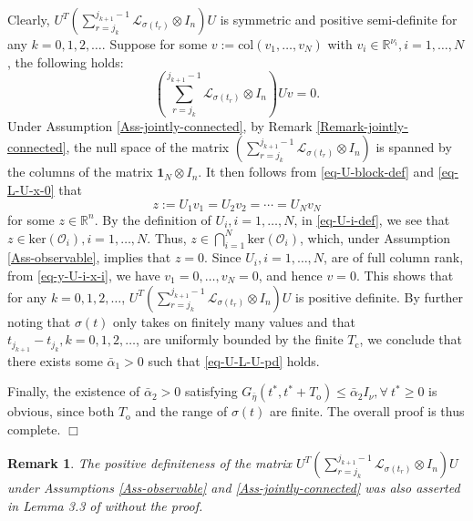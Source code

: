 \documentclass[twocolumn]{autart}
\newcommand{\RR}{\mathbb{R}}
\newtheorem{Remark}{Remark}
\newenvironment{Proof}{\noindent{\em Proof:\/}}{\hfill $\Box$\par}
\begin{document}
\begin{Proof}
Clearly, $U^{T}\left(\sum_{r=j_{k}}^{j_{k+1}-1}\mathcal{L}_{\sigma(t_{r})}\otimes I_{n} \right)U$
  is symmetric and positive semi-definite for any $k=0,1,2,\ldots$.
  Suppose for some
  $v :=\text{col}(v_{1},\ldots, v_{N})$ with $v_{i}\in \RR^{\nu_{i}}, i=1,\ldots,N$,
  the following holds:
  \begin{equation}\label{eq-L-U-x-0}
    \left(\sum_{r=j_{k}}^{j_{k+1}-1}\mathcal{L}_{\sigma(t_{r})}\otimes I_{n} \right)U v=0.
  \end{equation}
 Under Assumption \ref{Ass-jointly-connected}, by Remark \ref{Remark-jointly-connected},
  the null space of the matrix $\left(\sum_{r=j_{k}}^{j_{k+1}-1}\mathcal{L}_{\sigma(t_{r})}\otimes I_{n} \right)$
  is spanned by the columns of the matrix $\mathbf{1}_{N}\otimes I_{n}$.
 It then follows from \eqref{eq-U-block-def} and \eqref{eq-L-U-x-0} that
  \begin{equation}\label{eq-y-U-i-x-i}
    z:=U_{1}v_{1}=U_{2}v_{2}=\cdots=U_{N}v_{N}
  \end{equation}
 for some $z \in \RR^{n}$.
 By the definition of $U_{i}, i=1,\ldots,N$, in \eqref{eq-U-i-def},
 we see that $z \in \text{ker}(\mathcal{O}_{i}), i=1,\ldots,N$.
 Thus, $z\in \bigcap_{i=1}^{N}\text{ker}(\mathcal{O}_{i})$, which,
 under Assumption \ref{Ass-observable}, implies that $z=0$.
 Since $U_{i}, i=1,\ldots,N$, are of full column rank,
 from \eqref{eq-y-U-i-x-i}, we have $v_{1}=0, \ldots, v_{N}=0$, and hence $v=0$.
 This shows that for any $k=0,1,2,\ldots$,
 $U^{T}\left(\sum_{r=j_{k}}^{j_{k+1}-1}\mathcal{L}_{\sigma(t_{r})}\otimes I_{n} \right)U$ is positive definite.
 By further noting that $\sigma(t)$ only takes on finitely many values
 and that $t_{j_{k+1}}-t_{j_{k}}, k=0,1,2,\ldots$, are uniformly bounded by the finite $T_{\text{c}}$,
 we conclude that there exists some $\bar{\alpha}_{1}>0$ such that \eqref{eq-U-L-U-pd} holds.


Finally, the existence of $\bar{\alpha}_{2}>0$ satisfying
$G_{\bar{\eta}}(t^{*},t^{*}+T_{\text{o}}) \le \bar{\alpha}_{2}I_{\nu}, \forall\ t^{*}\ge 0$
is obvious, since both $T_{\text{o}}$ and the range of $\sigma(t)$ are finite.
The overall proof is thus complete.
\end{Proof}


\begin{Remark}
The  positive definiteness of the matrix $U^{T}\left(\sum_{r=j_{k}}^{j_{k+1}-1}\mathcal{L}_{\sigma(t_{r})}\otimes I_{n} \right)U$ under Assumptions \ref{Ass-observable} and \ref{Ass-jointly-connected} was also asserted in Lemma 3.3 of \cite{ZhangLu21ACC} without the proof.
\end{Remark}
\end{document}
